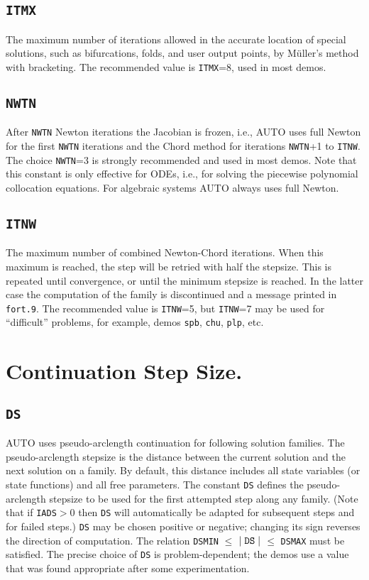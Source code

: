\documentclass[12pt]{report}
\def\abs#1{\mid#1\mid}
\begin{document}
\subsection{\tt ITMX}  \label{sec:ITMX}
 The maximum number of iterations allowed in the accurate
 location of special solutions, such as bifurcations, folds, 
 and user output points, by M\"uller's method with bracketing.
 The recommended value is {\tt ITMX}=8, used in most demos.

\subsection{\tt NWTN}  \label{sec:NWTN}
 After {\tt NWTN} Newton iterations the Jacobian is frozen, i.e.,
 {\cal AUTO} uses full Newton for the first {\tt NWTN} iterations
 and the Chord method for iterations {\tt NWTN}+1 to {\tt ITNW}.
 The choice {\tt NWTN}=3 is strongly recommended and used in most demos.
 Note that this constant is only effective for ODEs, i.e., for solving
 the piecewise polynomial collocation equations.
 For algebraic systems {\cal AUTO} always uses full Newton.

\subsection{\tt ITNW}  \label{sec:ITNW}
 The maximum number of combined Newton-Chord iterations.
 When this maximum is reached, the step will be retried with 
 half the stepsize.
 This is repeated until convergence, or until the minimum
 stepsize is reached. In the latter case the computation of
 the family is discontinued and a message printed in {\tt fort.9}.
 The recommended value is {\tt ITNW}=5, but {\tt ITNW}=7 may be used for 
 ``difficult'' problems, for example, 
 demos {\tt spb}, {\tt chu}, {\tt plp}, etc.

\section{ Continuation Step Size.} \label{sec:step_size}
\subsection{\tt DS}  \label{sec:DS}
 {\cal AUTO} uses pseudo-arclength continuation for following solution families.
 The pseudo-arclength stepsize is the distance between
 the current solution and the next solution on a family.
 By default, this distance includes all state variables
 (or state functions) and all free parameters.
 The constant {\tt DS} defines the pseudo-arclength stepsize to be used for the
 first attempted step along any family. 
 (Note that if {\tt IADS}$>$0 then {\tt DS} will automatically be adapted
 for subsequent steps and for failed steps.)
 {\tt DS} may be chosen positive or negative; changing its sign 
 reverses the direction of computation.
 The relation {\tt DSMIN} $\le$ $\abs {\tt DS}$ $\le$ {\tt DSMAX} must be satisfied.
 The precise choice of {\tt DS} is problem-dependent; the demos use a value 
 that was found appropriate after some experimentation.
 
\end{document}
